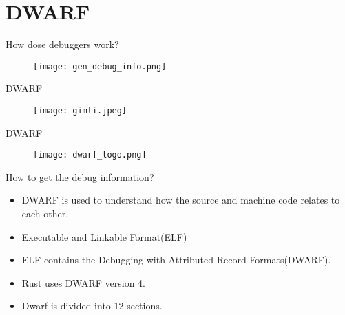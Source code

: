 \section{DWARF}
\begin{frame}{How dose debuggers work?}
	\begin{figure}
		\texttt{[image: gen\_debug\_info.png]}
	\end{figure}
\end{frame}

\begin{frame}{DWARF}
	\begin{figure}
		\texttt{[image: gimli.jpeg]}
	\end{figure}
\end{frame}


\begin{frame}{DWARF}
	\begin{figure}
		\texttt{[image: dwarf\_logo.png]}
	\end{figure}
\end{frame}

\begin{frame}{How to get the debug information?}
    \begin{itemize}
	    \item DWARF is used to understand how the source and machine code relates to each other.
	    \item Executable and Linkable Format(ELF)
	    \item ELF contains the Debugging with Attributed Record Formats(DWARF).
	    \item Rust uses DWARF version 4.
	    \item Dwarf is divided into 12 sections.
    \end{itemize}
\end{frame}

